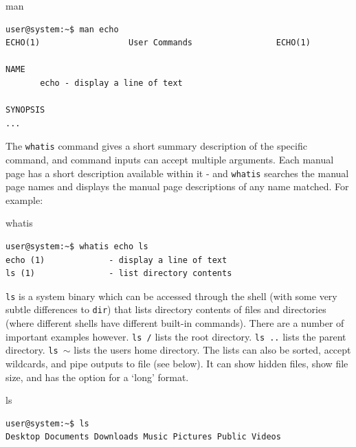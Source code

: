 \documentclass[11pt]{article}
\begin{document}
\begin{listing}[H]
\caption{man}\vspace{-0.1in}
\begin{verbatim}
user@system:~$ man echo
ECHO(1)                  User Commands                 ECHO(1)

NAME
       echo - display a line of text

SYNOPSIS
...
\end{verbatim}
\end{listing}

The \texttt{whatis} command gives a short summary description of the specific command, and command inputs can accept multiple arguments. Each manual page has a short description available within it - and \texttt{whatis} searches the manual page names and displays the manual page descriptions of any name matched. For example: \\

\begin{listing}[H]
\caption{whatis}\vspace{-0.1in}
\begin{verbatim}
user@system:~$ whatis echo ls
echo (1)             - display a line of text
ls (1)               - list directory contents
\end{verbatim}
\end{listing}

\texttt{ls} is a system binary which can be accessed through the shell (with some very subtle differences to \texttt{dir}) that lists directory contents of files and directories (where different shells have different built-in commands). There are a number of important examples however. \texttt{ls /} lists the root directory. \texttt{ls ..} lists the parent directory. \texttt{ls $\sim$} lists the users home directory. The lists can also be sorted, accept wildcards, and pipe outputs to file (see below). It can show hidden files, show file size, and has the option for a `long' format.\\

\begin{listing}[H]
\caption{ls}\vspace{-0.1in}
\begin{verbatim}
user@system:~$ ls
Desktop Documents Downloads Music Pictures Public Videos
\end{verbatim}
\end{listing}
\end{document}
